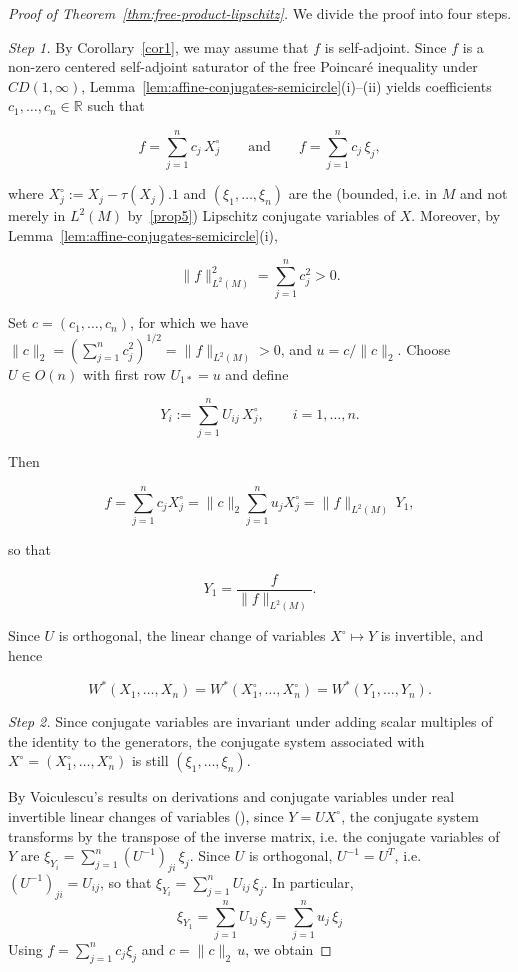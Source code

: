 \documentclass[10pt,a4paper,reqno]{amsart}
\begin{document}
\begin{proof}[Proof of Theorem~\ref{thm:free-product-lipschitz}]
We divide the proof into four steps.

\medskip
\noindent\textit{Step 1.}
By Corollary~\ref{cor1}, we may assume that $f$ is self-adjoint. Since $f$ is a non-zero
centered self-adjoint saturator of the free Poincaré inequality under $CD(1,\infty)$,
Lemma~\ref{lem:affine-conjugates-semicircle}(i)–(ii) yields coefficients
$c_1,\ldots,c_n\in \mathbb R$ such that


\[
  f=\sum_{j=1}^n c_j\,X_j^\circ
  \qquad\text{and}\qquad
  f=\sum_{j=1}^n c_j\,\xi_j,
\]


where $X_j^\circ:=X_j-\tau(X_j).1$ and $(\xi_1,\ldots,\xi_n)$ are the (bounded, i.e. in $M$ and not merely in $L^2(M)$ by~\ref{prop5}) Lipschitz
conjugate variables of $X$. Moreover, by Lemma~\ref{lem:affine-conjugates-semicircle}(i),


\[
  \|f\|_{L^2(M)}^2=\sum_{j=1}^n c_j^2>0.
\]



Set $c=(c_1,\ldots,c_n)$, for which we have  $\|c\|_2=(\sum_{j=1}^nc_j^2)^{1/2}=\|f\|_{L^2(M)}>0$, and $u=c/\|c\|_2$.
Choose $U\in O(n)$ with first row $U_{1\ast}=u$ and define


\[
  Y_i:=\sum_{j=1}^n U_{ij}\,X_j^\circ,
  \qquad i=1,\ldots,n.
\]


Then


\[
  f=\sum_{j=1}^n c_j X_j^\circ
    =\|c\|_2\sum_{j=1}^n u_j X_j^\circ
    =\|f\|_{L^2(M)}\,Y_1,
\]


so that


\[
  Y_1=\frac{f}{\|f\|_{L^2(M)}}.
\]


Since $U$ is orthogonal, the linear change of variables $X^\circ\mapsto Y$ is invertible, and hence


\[
  W^\ast(X_1,\ldots,X_n)
  =W^\ast(X_1^\circ,\ldots,X_n^\circ)
  =W^\ast(Y_1,\ldots,Y_n).
\]



\medskip
\noindent\textit{Step 2.} Since conjugate variables are invariant under adding scalar multiples of the identity to the generators, the conjugate system associated with $X^\circ=(X_1^\circ,\ldots,X_n^\circ)$ is still $(\xi_1,\ldots,\xi_n)$. 

\medskip



By Voiculescu’s results on derivations and conjugate variables under real invertible linear changes of
variables (\cite[Remark~6.6, Lemma~6.7, Corollary~6.8]{V}), since $Y = UX^\circ$, the
conjugate system transforms by the transpose of the inverse matrix, i.e. the conjugate variables of $Y$ are $\xi_{Y_i} = \sum_{j=1}^n
(U^{-1})_{ji}\,\xi_j$. Since $U$ is orthogonal, $U^{-1}=U^{T}$, i.e.
$(U^{-1})_{ji}=U_{ij}$, so that $
    \xi_{Y_i}=\sum_{j=1}^n
U_{ij}\,\xi_j$.
In particular, 
\begin{equation}
    \xi_{Y_1}=\sum_{j=1}^n
U_{1j}\,\xi_j=\sum_{j=1}^n u_j\,\xi_j
\end{equation}
\bigbreak
Using $f=\sum_{j=1}^n c_j\xi_j$ and $c=\|c\|_2\,u$, we obtain



\end{proof}
\end{document}
